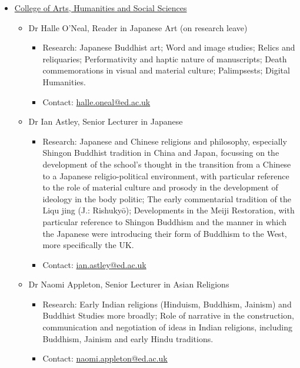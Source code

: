 \documentclass[11pt]{article}
\begin{document}
\begin{itemize}
\item \href{https://www.ed.ac.uk/arts-humanities-soc-sci}{College of Arts, Humanities and Social Sciences}
\label{sec:orgd170fc4}
\begin{itemize}
\item Dr Halle O’Neal, Reader in Japanese Art (on research leave)
\label{sec:org116be31}
\begin{itemize}
\item Research: Japanese Buddhist art; Word and image studies; Relics and reliquaries; Performativity and haptic nature of manuscripts; Death commemorations in visual and material culture; Palimpsests; Digital Humanities.\\
\item Contact: \href{mailto:halle.oneal@ed.ac.uk}{halle.oneal@ed.ac.uk}\\
\end{itemize}
\item Dr Ian Astley, Senior Lecturer in Japanese
\label{sec:orgb4e7725}
\begin{itemize}
\item Research: Japanese and Chinese religions and philosophy, especially Shingon Buddhist tradition in China and Japan, focussing on the development of the school's thought in the transition from a Chinese to a Japanese religio-political environment, with particular reference to the role of material culture and prosody in the development of ideology in the body politic; The early commentarial tradition of the Liqu jing (J.: Rishukyō); Developments in the Meiji Restoration, with particular reference to Shingon Buddhism and the manner in which the Japanese were introducing their form of Buddhism to the West, more specifically the UK.\\
\item Contact: \href{mailto:ian.astley@ed.ac.uk}{ian.astley@ed.ac.uk}\\
\end{itemize}
\item Dr Naomi Appleton, Senior Lecturer in Asian Religions
\label{sec:org3be2375}
\begin{itemize}
\item Research: Early Indian religions (Hinduism, Buddhism, Jainism) and Buddhist Studies more broadly; Role of narrative in the construction, communication and negotiation of ideas in Indian religions, including Buddhism, Jainism and early Hindu traditions.\\
\item Contact: \href{mailto:naomi.appleton@ed.ac.uk}{naomi.appleton@ed.ac.uk}\\

\end{itemize}
\end{itemize}
\end{itemize}
\end{document}
